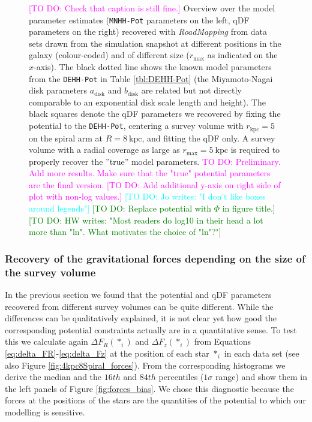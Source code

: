 \documentclass[iop,revtex4,numberedappendix,appendixfloats]{emulateapj}
\newcommand{\RM}{{\sl RoadMapping}}
\newcommand{\Wilma}[1]{\textcolor{Magenta}{#1}}
\newcommand{\HW}[1]{\textcolor{Green}{#1}}
\newcommand{\Jo}[1]{\textcolor{Cyan}{#1}}
\begin{document}
\begin{figure}[!htbp]
\caption{\Wilma{[TO DO: Check that caption is still fine.]} Overview over the model parameter estimates (\texttt{MNHH-Pot} parameters on the left, qDF parameters on the right) recovered with \RM{} from data sets drawn from the simulation snapshot at different positions in the galaxy (colour-coded) and of different size ($r_\text{max}$ as indicated on the $x$-axis). The black dotted line shows the known model parameters from the \texttt{DEHH-Pot} in Table \ref{tbl:DEHH-Pot} (the Miyamoto-Nagai disk parameters $a_\text{disk}$ and $b_\text{disk}$ are related but not directly comparable to an exponential disk scale length and height). The black squares denote the qDF parameters we recovered by fixing the potential to the \texttt{DEHH-Pot}, centering a survey volume with $r_\text{kpc}=5$ on the spiral arm at $R=8~\text{kpc}$, and fitting the qDF only. A survey volume with a radial coverage as large as $r_\text{max}=5~\text{kpc}$ is required to properly recover the ''true'' model parameters. \Wilma{TO DO: Preliminary. Add more results. Make sure that the "true" potential parameters are the final version.} \Wilma{[TO DO: Add additional y-axis on right side of plot with non-log values.]} \Jo{[TO DO: Jo writes: "I don't like boxes around legends"]} \HW{[TO DO: Replace potential with $\Phi$ in figure title.]} \HW{[TO DO: HW writes: "Most readers do log10 in their head a lot more than "ln". What motivates the choice of "ln"?"]}}
\label{fig:model_parameters}
\end{figure}

\subsubsection{Recovery of the gravitational forces depending on the size of the survey volume}\label{sec:forces_bias}

In the previous section we found that the potential and qDF parameters recovered from different survey volumes can be quite different. While the differences can be qualitatively explained, it is not clear yet how good the corresponding potential constraints actually are in a quantitative sense. To test this we calculate again $\Delta F_R(*_i)$ and $\Delta F_z(*_i)$ from Equations \eqref{eq:delta_FR}-\eqref{eq:delta_Fz} at the position of each star $*_i$ in each data set (see also Figure \ref{fig:4kpc8Spiral_forces}). From the corresponding histograms we derive the median and the $16th$ and $84th$ percentiles ($1\sigma$ range) and show them in the left panels of Figure \ref{fig:forces_bias}. We chose this diagnostic because the forces at the positions of the stars are the quantities of the potential to which our modelling is sensitive.
\end{document}
